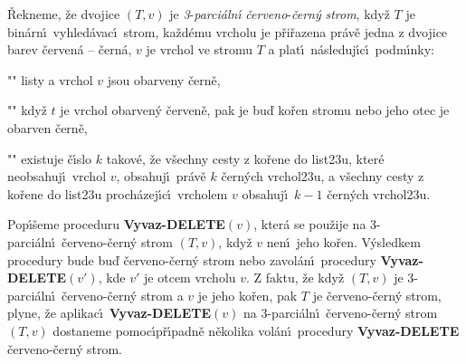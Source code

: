 \flushpar\v Rekneme, \v ze dvojice $\left(T,v\right)$ je \emph{3}-\emph{parci\'aln\'\i} 
\emph{\v cerveno}-\emph{\v cern\'y} \emph{strom}, kdy\v z $T$ je bin\'arn\'\i\ 
vy\-hled\'avac\'\i\ strom, ka\v zd\'emu vrcholu je p\v ri\-\v razena pr\'av\v e jedna z 
dvojice barev \v cerven\'a -- \v cern\'a, $v$ je vrchol ve stromu $
T$ a 
plat\'\i\ n\'asleduj\'\i c\'\i\ podm\'\i nky: 
\roster
\item"{}"
listy a vrchol $v$ jsou obarveny \v cern\v e,
\item"{}"
kdy\v z $t$ je vrchol obarven\'y \v cerven\v e, pak je bu\v d ko\v ren 
stromu nebo jeho otec je obarven \v cern\v e,
\item"{}"
existuje \v c\'\i slo $k$ takov\'e, \v ze v\v sechny cesty z ko\v rene do 
list\accent23u, kter\'e neobsahuj\'\i\ vrchol $v$, obsahuj\'\i\ pr\'av\v e 
$k$ \v cer\-n\'ych vrchol\accent23u, a v\v sechny cesty z ko\v rene do 
list\accent23u proch\'a\-ze\-j\'\i\-c\'\i\ vrcholem $v$ obsahuj\'\i\ $
k-1$ \v cern\'ych 
vrchol\accent23u.
\endroster
\medskip

\flushpar Pop\'\i\v seme proceduru {\bf Vyvaz-DELETE$\left(v\right)$}, kter\'a se 
pou\v zije na 3-parci\'aln\'\i\ \v cerveno-\v cern\'y strom $\left(T,v\right)$, kdy\v z $
v$ nen\'\i\ jeho 
ko\v ren.  V\'ysledkem procedury bude bu\v d \v cerveno-\v cern\'y strom 
nebo zavol\'an\'\i\ procedury {\bf Vyvaz-DELE\-TE$\left(v'\right)$}, kde $v'$ je otcem 
vrcholu $v$.  Z faktu, \v ze kdy\v z $\left(T,v\right)$ je 3-parci\'aln\'\i\ \v cerveno-\v cern\'y 
strom a $v$ je jeho ko\v ren, pak $T$ je \v cerveno-\v cern\'y strom, plyne, 
\v ze aplikac\'\i\ {\bf Vyvaz-DELETE$\left(v\right)$} na 3-parci\'aln\'\i\ \v cerveno-\v cern\'y strom 
$\left(T,v\right)$ dostaneme pomoc\'\i p\v r\'\i padn\v e n\v ekolika vol\'an\'\i\ procedury {\bf Vyvaz-DELETE} \v cerveno-\v cern\'y strom.  
\medskip

